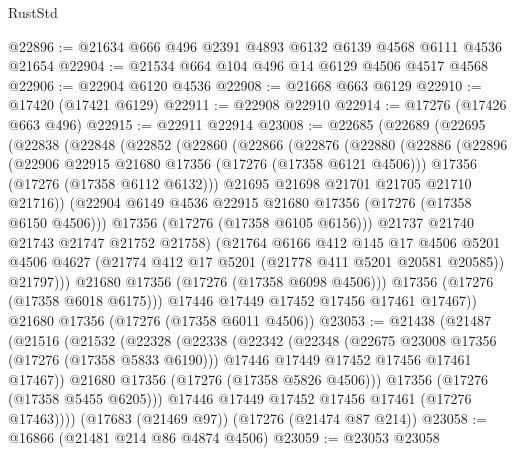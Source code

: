 \begin{lexlean}{RustStd}
\begin{coremodule}
@22896 := @21634 @666 @496 @2391 @4893 @6132 @6139 @4568 @6111 @4536 @21654
@22904 := @21534 @664 @104 @496 @14 @6129 @4506 @4517 @4568
@22906 := @22904 @6120 @4536
@22908 := @21668 @663 @6129
@22910 := @17420 (@17421 @6129)
@22911 := @22908 @22910
@22914 := @17276 (@17426 @663 @496)
@22915 := @22911 @22914
@23008 := @22685
    (@22689
      (@22695
        (@22838
          (@22848
            (@22852
              (@22860
                (@22866
                  (@22876
                    (@22880
                      (@22886
                        (@22896
                          (@22906 @22915 @21680 @17356 (@17276 (@17358 @6121 @4506)))
                          @17356
                          (@17276 (@17358 @6112 @6132)))
                        @21695
                        @21698
                        @21701
                        @21705
                        @21710
                        @21716))
                    (@22904 @6149 @4536 @22915 @21680 @17356 (@17276 (@17358 @6150 @4506)))
                    @17356
                    (@17276 (@17358 @6105 @6156)))
                  @21737
                  @21740
                  @21743
                  @21747
                  @21752
                  @21758)
                (@21764
                  @6166
                  @412
                  @145
                  @17
                  @4506
                  @5201
                  @4506
                  @4627
                  (@21774 @412 @17 @5201 (@21778 @411 @5201 @20581 @20585))
                  @21797)))
            @21680
            @17356
            (@17276 (@17358 @6098 @4506)))
          @17356
          (@17276 (@17358 @6018 @6175)))
        @17446
        @17449
        @17452
        @17456
        @17461
        @17467))
    @21680
    @17356
    (@17276 (@17358 @6011 @4506))
@23053 := @21438
    (@21487
      (@21516
        (@21532
          (@22328
            (@22338
              (@22342
                (@22348
                  (@22675 @23008 @17356 (@17276 (@17358 @5833 @6190)))
                  @17446
                  @17449
                  @17452
                  @17456
                  @17461
                  @17467))
              @21680
              @17356
              (@17276 (@17358 @5826 @4506)))
            @17356
            (@17276 (@17358 @5455 @6205)))
          @17446
          @17449
          @17452
          @17456
          @17461
          (@17276 @17463))))
    (@17683 (@21469 @97))
    (@17276 (@21474 @87 @214))
@23058 := @16866 (@21481 @214 @86 @4874 @4506)
@23059 := @23053 @23058

\end{coremodule}
\end{lexlean}
